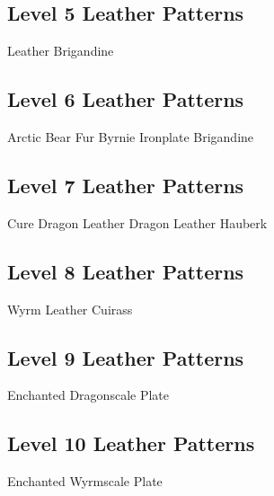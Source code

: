 \subsection{Level 5 Leather Patterns}
Leather Brigandine

\subsection{Level 6 Leather Patterns}
Arctic Bear Fur Byrnie
Ironplate Brigandine

\subsection{Level 7 Leather Patterns}
Cure Dragon Leather
Dragon Leather Hauberk

\subsection{Level 8 Leather Patterns}
Wyrm Leather Cuirass

\subsection{Level 9 Leather Patterns}
Enchanted Dragonscale Plate

\subsection{Level 10 Leather Patterns}
Enchanted Wyrmscale Plate
















